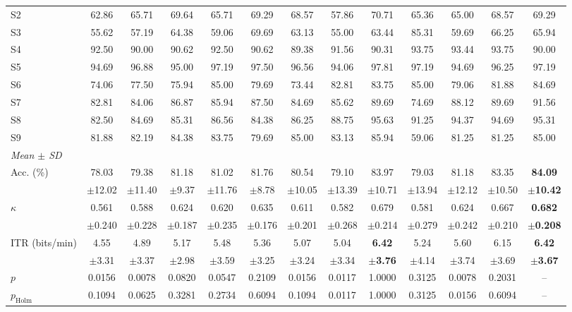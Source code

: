 \documentclass[preprint,12pt]{elsarticle}
\begin{document}
\begin{table}
\begin{adjustbox}{max width=\dimexpr\textheight+80pt\relax}
\begin{tabular}{l@{\hspace{6pt}}cccccc@{\hspace{6pt}}cc@{\hspace{6pt}}ccc@{\hspace{6pt}}c}
S2 & 62.86 & 65.71 & 69.64 & 65.71 & 69.29 & 68.57 & 57.86 & 70.71 & 65.36 & 65.00 & 68.57 & 69.29 \\
S3 & 55.62 & 57.19 & 64.38 & 59.06 & 69.69 & 63.13 & 55.00 & 63.44 & 85.31 & 59.69 & 66.25 & 65.94 \\
S4 & 92.50 & 90.00 & 90.62 & 92.50 & 90.62 & 89.38 & 91.56 & 90.31 & 93.75 & 93.44 & 93.75 & 90.00 \\
S5 & 94.69 & 96.88 & 95.00 & 97.19 & 97.50 & 96.56 & 94.06 & 97.81 & 97.19 & 94.69 & 96.25 & 97.19 \\
S6 & 74.06 & 77.50 & 75.94 & 85.00 & 79.69 & 73.44 & 82.81 & 83.75 & 85.00 & 79.06 & 81.88 & 84.69 \\
S7 & 82.81 & 84.06 & 86.87 & 85.94 & 87.50 & 84.69 & 85.62 & 89.69 & 74.69 & 88.12 & 89.69 & 91.56 \\
S8 & 82.50 & 84.69 & 85.31 & 86.56 & 84.38 & 86.25 & 88.75 & 95.63 & 91.25 & 94.37 & 94.69 & 95.31 \\
S9 & 81.88 & 82.19 & 84.38 & 83.75 & 79.69 & 85.00 & 83.13 & 85.94 & 59.06 & 81.25 & 81.25 & 85.00 \\
\midrule
\multicolumn{13}{l}{\textit{Mean $\pm$ SD}} \\
Acc. (\%) & 78.03 & 79.38 & 81.18 & 81.02 & 81.76 & 80.54 & 79.10 & 83.97 & 79.03 & 81.18 & 83.35 & \textbf{84.09} \\
 & $\pm$12.02 & $\pm$11.40 & $\pm$9.37 & $\pm$11.76 & $\pm$8.78 & $\pm$10.05 & $\pm$13.39 & $\pm$10.71 & $\pm$13.94 & $\pm$12.12 & $\pm$10.50 & \textbf{$\pm$10.42} \\
$\kappa$ & 0.561 & 0.588 & 0.624 & 0.620 & 0.635 & 0.611 & 0.582 & 0.679 & 0.581 & 0.624 & 0.667 & \textbf{0.682} \\
 & $\pm$0.240 & $\pm$0.228 & $\pm$0.187 & $\pm$0.235 & $\pm$0.176 & $\pm$0.201 & $\pm$0.268 & $\pm$0.214 & $\pm$0.279 & $\pm$0.242 & $\pm$0.210 & \textbf{$\pm$0.208} \\
ITR (bits/min) & 4.55 & 4.89 & 5.17 & 5.48 & 5.36 & 5.07 & 5.04 & \textbf{6.42} & 5.24 & 5.60 & 6.15 & \textbf{6.42} \\
 & $\pm$3.31 & $\pm$3.37 & $\pm$2.98 & $\pm$3.59 & $\pm$3.25 & $\pm$3.24 & $\pm$3.34 & \textbf{$\pm$3.76} & $\pm$4.14 & $\pm$3.74 & $\pm$3.69 & \textbf{$\pm$3.67} \\
\midrule
$p$ & 0.0156 & 0.0078 & 0.0820 & 0.0547 & 0.2109 & 0.0156 & 0.0117 & 1.0000 & 0.3125 & 0.0078 & 0.2031 & -- \\
$p_\mathrm{Holm}$ & 0.1094 & 0.0625 & 0.3281 & 0.2734 & 0.6094 & 0.1094 & 0.0117 & 1.0000 & 0.3125 & 0.0156 & 0.6094 & -- \\

\end{tabular}
\end{adjustbox}
\end{table}
\end{document}
